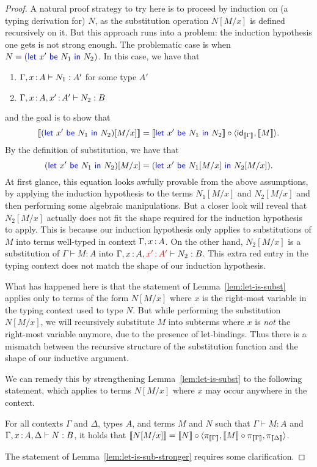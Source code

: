 \begin{proof}
  A natural proof strategy to try here is to proceed by induction on (a typing derivation for) \(N\),
  as the substitution operation \(N[M/x]\) is defined recursively on it.
  But this approach runs into a problem: the induction hypothesis one gets is not
  strong enough.
  The problematic case is when \(N = (\mathsf{{\color{blue}let}}~x'~\mathsf{{\color{blue}be}}~N_1~\mathsf{{\color{blue}in}}~N_2)\).
  In this case, we have that
  \begin{enumerate}
  \item \(\Gamma,x\,{:}\, A \vdash N_1 : A'\) for some type \(A'\)
  \item \(\Gamma,x\,{:}\, A,x'\,{:}\, A' \vdash N_2 : B\)
  \end{enumerate}
  and the goal is to show that
  \begin{equation}
    \left\llbracket (\mathsf{{\color{blue}let}}~x'~\mathsf{{\color{blue}be}}~N_1~\mathsf{{\color{blue}in}}~N_2)[M/x]\right\rrbracket = \left\llbracket \mathsf{{\color{blue}let}}~x'~\mathsf{{\color{blue}be}}~N_1~\mathsf{{\color{blue}in}}~N_2\right\rrbracket \circ \langle \mathsf{id}_{\left\llbracket \Gamma\right\rrbracket},\left\llbracket M\right\rrbracket\rangle.
  \end{equation}
  By the definition of substitution, we have that
  \[
  (\mathsf{{\color{blue}let}}~x'~\mathsf{{\color{blue}be}}~N_1~\mathsf{{\color{blue}in}}~N_2)[M/x] = (\mathsf{{\color{blue}let}}~x'~\mathsf{{\color{blue}be}}~N_1[M/x]~\mathsf{{\color{blue}in}}~N_2[M/x]).
  \]
  At first glance, this equation looks awfully provable from the above assumptions,
  by applying the induction hypothesis to
  the terms \(N_1[M/x]\) and \(N_2[M/x]\) and then performing some algebraic manipulations.
  But a closer look will reveal that \(N_2[M/x]\) actually does not fit the shape required
  for the induction hypothesis to apply.
  This is because our induction hypothesis only applies to substitutions of \(M\)
  into terms well-typed in context \(\Gamma,x\,{:}\, A\).
  On the other hand, \(N_2[M/x]\) is a substitution
  of \(\Gamma \vdash M : A\) into \(\Gamma,x\,{:}\, A,{\color{red}x'\,{:}\, A'} \vdash N_2 : B\).
  This extra red entry in the typing context does not match the shape of our induction hypothesis.

  What has happened here is that the statement of Lemma~\ref{lem:let-is-subst}
  applies only to terms of the form \(N[M/x]\) where \(x\) is the right-most variable
  in the typing context used to type \(N\). But while performing the substitution \(N[M/x]\),
  we will recursively substitute \(M\) into subterms where \(x\) is \emph{not} the right-most variable
  anymore, due to the presence of let-bindings.
  Thus there is a mismatch between the recursive structure of the substitution function
  and the shape of our inductive argument.

  We can remedy this by strengthening Lemma~\ref{lem:let-is-subst}
  to the following statement, which applies to terms \(N[M/x]\) where \(x\) may occur anywhere in the context.
  \begin{lemma} \label{lem:let-is-sub-stronger}
    For all contexts \(\Gamma\) and \(\Delta\), types \(A\),
    and terms \(M\) and \(N\)
    such that \(\Gamma \vdash M : A\)
    and \(\Gamma,x\,{:}\, A,\Delta \vdash N : B\),
    it holds that
    \(\left\llbracket N[M/x]\right\rrbracket = \left\llbracket N\right\rrbracket \circ \langle \pi_{\left\llbracket \Gamma\right\rrbracket},\left\llbracket M\right\rrbracket \circ \pi_{\left\llbracket \Gamma\right\rrbracket},\pi_{\left\llbracket \Delta\right\rrbracket}\rangle\).
  \end{lemma}
  The statement of Lemma~\ref{lem:let-is-sub-stronger} requires some clarification.


\end{proof}
